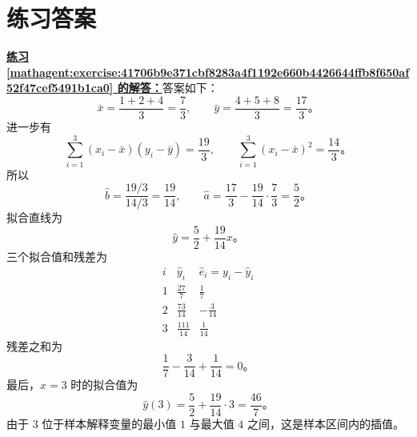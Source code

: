 \documentclass[UTF8,fontset=fandol,11pt]{ctexart}
\begin{document}
\section*{练习答案}
\par\noindent\textbf{\hyperref[mathagent:exercise:41706b9e371cbf8283a4f1192e660b4426644ffb8f650af52f47cef5491b1ca0]{练习 \ref*{mathagent:exercise:41706b9e371cbf8283a4f1192e660b4426644ffb8f650af52f47cef5491b1ca0} 的解答：}}答案如下：
\[
\bar x=\frac{1+2+4}{3}=\frac73,
\qquad
\bar y=\frac{4+5+8}{3}=\frac{17}{3}\text{。}
\]
进一步有
\[
\sum_{i=1}^{3}(x_i-\bar x)(y_i-\bar y)=\frac{19}{3},
\qquad
\sum_{i=1}^{3}(x_i-\bar x)^2=\frac{14}{3}\text{。}
\]
所以
\[
\hat b=\frac{19/3}{14/3}=\frac{19}{14},
\qquad
\hat a=\frac{17}{3}-\frac{19}{14}\cdot\frac73=\frac52\text{。}
\]
拟合直线为
\[
\hat y=\frac52+\frac{19}{14}x\text{。}
\]
三个拟合值和残差为
\[
\begin{array}{c|c|c}
 i&\hat y_i&\hat e_i=y_i-\hat y_i\\ \hline
 1&\frac{27}{7}&\frac17\\
 2&\frac{73}{14}&-\frac{3}{14}\\
 3&\frac{111}{14}&\frac{1}{14}
\end{array}
\]
残差之和为
\[
\frac17-\frac{3}{14}+\frac{1}{14}=0\text{。}
\]
最后，$x=3$ 时的拟合值为
\[
\hat y(3)=\frac52+\frac{19}{14}\cdot3=\frac{46}{7}\text{。}
\]
由于 $3$ 位于样本解释变量的最小值 $1$ 与最大值 $4$ 之间，这是样本区间内的插值。\par
\end{document}
